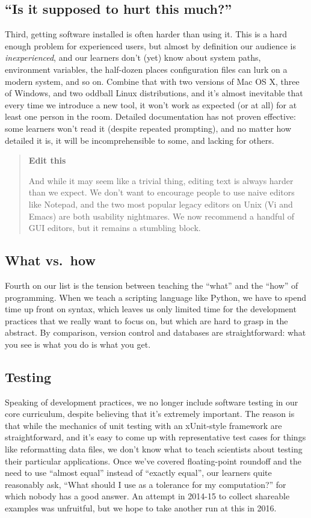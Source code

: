 \documentclass[10pt,a4paper,twocolumn]{article}
\begin{document}
\subsection*{``Is it supposed to hurt this much?''}

Third, getting software installed is often harder than using it. This
is a hard enough problem for experienced users, but almost by
definition our audience is \emph{inexperienced}, and our learners
don't (yet) know about system paths, environment variables, the
half-dozen places configuration files can lurk on a modern system, and
so on. Combine that with two versions of Mac OS X, three of Windows,
and two oddball Linux distributions, and it's almost inevitable that
every time we introduce a new tool, it won't work as expected (or at
all) for at least one person in the room. Detailed documentation has
not proven effective: some learners won't read it (despite repeated
prompting), and no matter how detailed it is, it will be
incomprehensible to some, and lacking for others.

\begin{quote}
\textbf{Edit this}

And while it may seem like a trivial thing, editing text is always
harder than we expect. We don't want to encourage people to use naive
editors like Notepad, and the two most popular legacy editors on Unix
(Vi and Emacs) are both usability nightmares. We now recommend a
handful of GUI editors, but it remains a stumbling block.
\end{quote}

\subsection*{What vs.~how}

Fourth on our list is the tension between teaching the ``what'' and the
``how'' of programming. When we teach a scripting language like Python,
we have to spend time up front on syntax, which leaves us only limited
time for the development practices that we really want to focus on, but
which are hard to grasp in the abstract. By comparison, version control
and databases are straightforward: what you see is what you do is what
you get.

\subsection*{Testing}

Speaking of development practices, we no longer include software
testing in our core curriculum, despite believing that it's extremely
important.  The reason is that while the mechanics of unit testing
with an xUnit-style framework are straightforward, and it's easy to
come up with representative test cases for things like reformatting
data files, we don't know what to teach scientists about testing their
particular applications.  Once we've covered floating-point roundoff
and the need to use ``almost equal'' instead of ``exactly equal'', our
learners quite reasonably ask, ``What should I use as a tolerance for
my computation?'' for which nobody has a good answer.  An attempt in
2014-15 to collect shareable examples was unfruitful, but we hope to
take another run at this in 2016.
\end{document}

